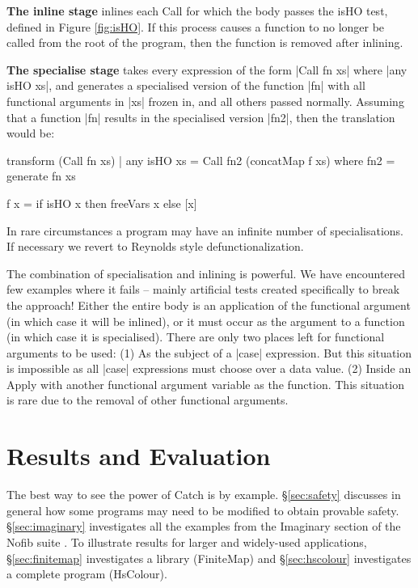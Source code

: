 \documentclass[preprint]{sigplanconf}
\let\cite=\citep
\newcommand{\C}[1]{\textsf{#1}}
\newcommand{\para}[1]{\vspace{2mm}\noindent\textbf{#1}}
\begin{document}
\para{The \C{inline} stage} inlines each \C{Call} for which the body passes the \C{isHO} test, defined in Figure \ref{fig:isHO}. If this process causes a function to no longer be called from the root of the program, then the function is removed after inlining.

\para{The \C{specialise} stage} takes every expression of the form |Call fn xs| where |any isHO xs|, and generates a specialised version of the function |fn| with all functional arguments in |xs| frozen in, and all others passed normally. Assuming that a function |fn| results in the specialised version |fn2|, then the translation would be:

\begin{code}
transform (Call fn xs) | any isHO xs =
    Call fn2 (concatMap f xs)
    where
    fn2 = generate fn xs

    f x = if isHO x then freeVars x else [x]
\end{code}

In rare circumstances a program may have an infinite number of specialisations. If necessary we revert to Reynolds style defunctionalization.

The combination of specialisation and inlining is powerful. We have encountered few examples where it fails -- mainly artificial tests created specifically to break the approach! Either the entire body is an application of the functional argument (in which case it will be inlined), or it must occur as the argument to a function (in which case it is specialised). There are only two places left for functional arguments to be used: (1) As the subject of a |case| expression. But this situation is impossible as all |case| expressions must choose over a data value. (2) Inside an \C{Apply} with another functional argument variable as the function. This situation is rare due to the removal of other functional arguments.

\section{Results and Evaluation}
\label{sec:results}

The best way to see the power of Catch is by example. \S\ref{sec:safety} discusses in general how some programs may need to be modified to obtain provable safety. \S\ref{sec:imaginary} investigates all the examples from the Imaginary section of the Nofib suite \cite{nofib}. To illustrate results for larger and widely-used applications, \S\ref{sec:finitemap} investigates a library (FiniteMap) and \S\ref{sec:hscolour} investigates a complete program (HsColour).
\end{document}
